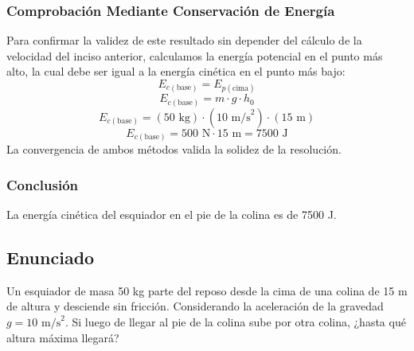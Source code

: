 \documentclass[12pt,a4paper]{article}
\begin{document}
\subsubsection*{Comprobación Mediante Conservación de Energía}
Para confirmar la validez de este resultado sin depender del cálculo de la velocidad del inciso anterior, calculamos la energía potencial en el punto más alto, la cual debe ser igual a la energía cinética en el punto más bajo:
$$E_{c(\text{base})} = E_{p(\text{cima})}$$
$$E_{c(\text{base})} = m \cdot g \cdot h_0$$
$$E_{c(\text{base})} = (50 \text{ kg}) \cdot (10 \text{ m/s}^2) \cdot (15 \text{ m})$$
$$E_{c(\text{base})} = 500 \text{ N} \cdot 15 \text{ m} = 7500 \text{ J}$$
La convergencia de ambos métodos valida la solidez de la resolución.

\subsubsection*{Conclusión}
La energía cinética del esquiador en el pie de la colina es de 7500 J.

\newpage
\subsection*{Enunciado}
Un esquiador de masa 50 kg parte del reposo desde la cima de una colina de 15 m de altura y desciende sin fricción. Considerando la aceleración de la gravedad $g = 10 \text{ m/s}^2$. Si luego de llegar al pie de la colina sube por otra colina, ¿hasta qué altura máxima llegará?

\begin{center}
\end{center}
\end{document}
